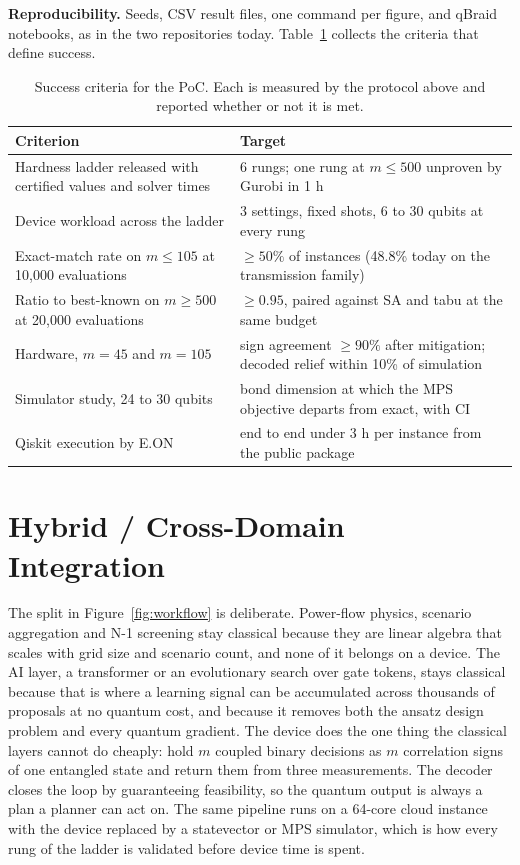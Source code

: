 \documentclass[10pt,a4paper]{article}
\begin{document}
\textbf{Reproducibility.} Seeds, CSV result files, one command per figure, and
qBraid notebooks, as in the two repositories today. Table~\ref{tab:success}
collects the criteria that define success.

\begin{table}[t]
\centering
\caption{Success criteria for the PoC. Each is measured by the protocol above
and reported whether or not it is met.}
\label{tab:success}
\begin{tabularx}{\textwidth}{@{}Xl@{}}
\toprule
Criterion & Target \\
\midrule
Hardness ladder released with certified values and solver times & 6 rungs; one rung at $m\le500$ unproven by Gurobi in 1 h \\
Device workload across the ladder & 3 settings, fixed shots, 6 to 30 qubits at every rung \\
Exact-match rate on $m\le105$ at 10,000 evaluations & $\ge50\%$ of instances (48.8\% today on the transmission family) \\
Ratio to best-known on $m\ge500$ at 20,000 evaluations & $\ge0.95$, paired against SA and tabu at the same budget \\
Hardware, $m=45$ and $m=105$ & sign agreement $\ge90\%$ after mitigation; decoded relief within 10\% of simulation \\
Simulator study, 24 to 30 qubits & bond dimension at which the MPS objective departs from exact, with CI \\
Qiskit execution by E.ON & end to end under 3 h per instance from the public package \\
\bottomrule
\end{tabularx}
\end{table}

\section{Hybrid / Cross-Domain Integration}

The split in Figure~\ref{fig:workflow} is deliberate. Power-flow physics,
scenario aggregation and N-1 screening stay classical because they are linear
algebra that scales with grid size and scenario count, and none of it belongs
on a device. The AI layer, a transformer or an evolutionary search over gate
tokens, stays classical because that is where a learning signal can be
accumulated across thousands of proposals at no quantum cost, and because it
removes both the ansatz design problem and every quantum gradient. The device
does the one thing the classical layers cannot do cheaply: hold $m$ coupled
binary decisions as $m$ correlation signs of one entangled state and return
them from three measurements. The decoder closes the loop by guaranteeing
feasibility, so the quantum output is always a plan a planner can act on. The
same pipeline runs on a 64-core cloud instance with the device replaced by a
statevector or MPS simulator, which is how every rung of the ladder is
validated before device time is spent.
\end{document}

